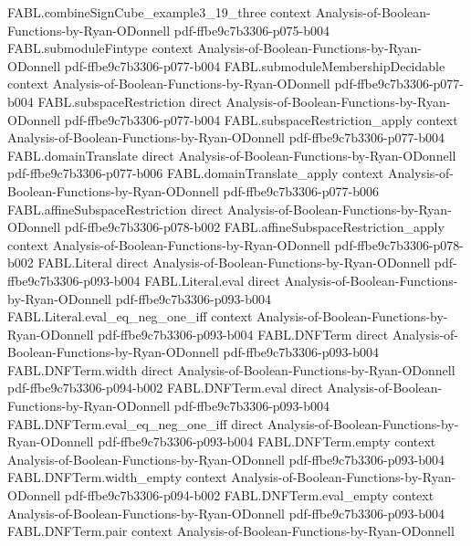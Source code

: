 \begin{theorem}
\proofstep
  {FABL.combineSignCube_example3_19_three}
  {context}
  {Analysis-of-Boolean-Functions-by-Ryan-ODonnell}
  {pdf-ffbe9c7b3306-p075-b004}
\proofstep
  {FABL.submoduleFintype}
  {context}
  {Analysis-of-Boolean-Functions-by-Ryan-ODonnell}
  {pdf-ffbe9c7b3306-p077-b004}
\proofstep
  {FABL.submoduleMembershipDecidable}
  {context}
  {Analysis-of-Boolean-Functions-by-Ryan-ODonnell}
  {pdf-ffbe9c7b3306-p077-b004}
\proofstep
  {FABL.subspaceRestriction}
  {direct}
  {Analysis-of-Boolean-Functions-by-Ryan-ODonnell}
  {pdf-ffbe9c7b3306-p077-b004}
\proofstep
  {FABL.subspaceRestriction_apply}
  {context}
  {Analysis-of-Boolean-Functions-by-Ryan-ODonnell}
  {pdf-ffbe9c7b3306-p077-b004}
\proofstep
  {FABL.domainTranslate}
  {direct}
  {Analysis-of-Boolean-Functions-by-Ryan-ODonnell}
  {pdf-ffbe9c7b3306-p077-b006}
\proofstep
  {FABL.domainTranslate_apply}
  {context}
  {Analysis-of-Boolean-Functions-by-Ryan-ODonnell}
  {pdf-ffbe9c7b3306-p077-b006}
\proofstep
  {FABL.affineSubspaceRestriction}
  {direct}
  {Analysis-of-Boolean-Functions-by-Ryan-ODonnell}
  {pdf-ffbe9c7b3306-p078-b002}
\proofstep
  {FABL.affineSubspaceRestriction_apply}
  {context}
  {Analysis-of-Boolean-Functions-by-Ryan-ODonnell}
  {pdf-ffbe9c7b3306-p078-b002}
\proofstep
  {FABL.Literal}
  {direct}
  {Analysis-of-Boolean-Functions-by-Ryan-ODonnell}
  {pdf-ffbe9c7b3306-p093-b004}
\proofstep
  {FABL.Literal.eval}
  {direct}
  {Analysis-of-Boolean-Functions-by-Ryan-ODonnell}
  {pdf-ffbe9c7b3306-p093-b004}
\proofstep
  {FABL.Literal.eval_eq_neg_one_iff}
  {context}
  {Analysis-of-Boolean-Functions-by-Ryan-ODonnell}
  {pdf-ffbe9c7b3306-p093-b004}
\proofstep
  {FABL.DNFTerm}
  {direct}
  {Analysis-of-Boolean-Functions-by-Ryan-ODonnell}
  {pdf-ffbe9c7b3306-p093-b004}
\proofstep
  {FABL.DNFTerm.width}
  {direct}
  {Analysis-of-Boolean-Functions-by-Ryan-ODonnell}
  {pdf-ffbe9c7b3306-p094-b002}
\proofstep
  {FABL.DNFTerm.eval}
  {direct}
  {Analysis-of-Boolean-Functions-by-Ryan-ODonnell}
  {pdf-ffbe9c7b3306-p093-b004}
\proofstep
  {FABL.DNFTerm.eval_eq_neg_one_iff}
  {direct}
  {Analysis-of-Boolean-Functions-by-Ryan-ODonnell}
  {pdf-ffbe9c7b3306-p093-b004}
\proofstep
  {FABL.DNFTerm.empty}
  {context}
  {Analysis-of-Boolean-Functions-by-Ryan-ODonnell}
  {pdf-ffbe9c7b3306-p093-b004}
\proofstep
  {FABL.DNFTerm.width_empty}
  {context}
  {Analysis-of-Boolean-Functions-by-Ryan-ODonnell}
  {pdf-ffbe9c7b3306-p094-b002}
\proofstep
  {FABL.DNFTerm.eval_empty}
  {context}
  {Analysis-of-Boolean-Functions-by-Ryan-ODonnell}
  {pdf-ffbe9c7b3306-p093-b004}
\proofstep
  {FABL.DNFTerm.pair}
  {context}
  {Analysis-of-Boolean-Functions-by-Ryan-ODonnell}

\end{theorem}

